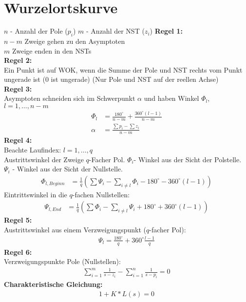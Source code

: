 \setcounter{section}{7}
\section{Wurzelortskurve}
\begin{tcolorbox}[colback=white!10!white,colframe=blue!50!white,title=Konstruktionsregeln]
    $n$ - Anzahl der Pole ($p_i$)\hspace{1cm}
    $m$ - Anzahl der NST ($z_i$)
    \tcblower  %
    \textbf{Regel 1:}\\
    $n-m$ Zweige gehen zu den  Asymptoten\\
    $m$ Zweige enden in den NSTs\\

    \textbf{Regel 2:}\\
        Ein Punkt ist auf WOK, wenn die Summe der Pole und NST rechts vom Punkt ungerade ist (0 ist ungerade) (Nur Pole und NST auf der reellen Achse)\\
        
    \textbf{Regel 3:}\\
    Asymptoten schneiden sich im Schwerpunkt $\alpha$ und haben Winkel $\Phi_l$, $l =1,\dots,n-m$
    \begin{align*}
        \Phi_l &= \frac{180^\circ}{n-m}+\frac{360^\circ(l-1)}{n-m}\\
        \alpha &=    \frac{\sum p_i - \sum z_i}{n-m}
    \end{align*}
        \textbf{Regel 4:}\\
        Beachte Laufindex: $l=1,\dots,q$\\
        Austrittswinkel  der Zweige $q$-Facher Pol. $\Phi_i$- Winkel aus der Sicht der Polstelle. $\Psi_i$ - Winkel aus der Sicht der Nullstelle.
        \begin{align*}
            \Phi_{l,Beginn} &= \frac{1}{q}\left (\sum\Psi_i-\sum_{i\not= l}\Phi_i-180^\circ-360^\circ(l-1)\right )
        \end{align*}
        Eintrittswinkel in die $q$-fachen Nullstellen:
        \begin{align*}
            \Psi_{l,End} &= \frac{1}{q}\left (\sum\Phi_i-\sum_{i\not= l}\Psi_i+180^\circ+360^\circ(l-1)\right )
        \end{align*}
        \textbf{Regel 5:}\\
        Austrittswinkel aus einem Verzweigungspunkt ($q$-facher Pol):
        \begin{align*}
            \Psi_l = \frac{180^\circ}{q}+360^\circ\frac{l-1}{q}
        \end{align*}
        \textbf{Regel 6:}\\
        Verzweigungspunkte Pole (Nullstellen):
        \begin{align*}
            \sum_{i=1}^{m}\frac{1}{s-z_i}-\sum_{i=1}^{n}\frac{1}{s-p_i} =0
        \end{align*}
        \textbf{Charakteristische Gleichung:}
        \begin{align*}
            1+ K*L(s) = 0
        \end{align*}
        

\end{tcolorbox}
